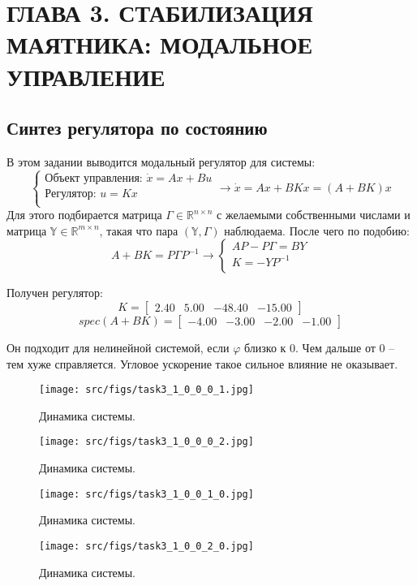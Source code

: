 \section{ГЛАВА 3. СТАБИЛИЗАЦИЯ МАЯТНИКА: МОДАЛЬНОЕ УПРАВЛЕНИЕ}

\subsection{Синтез регулятора по состоянию}
В этом задании выводится модальный регулятор для системы:
\[
        \begin{cases}
                \text{Объект управления: }\dot{x} = A x + Bu \\
                \text{Регулятор: }u = K x \\
        \end{cases} \rightarrow
        \dot{x} = A x + BKx = (A+BK)x
\]
Для этого подбирается матрица \(\Gamma \in \mathds{R}^{n \times n}\) с желаемыми собственными числами и матрица \(\mathds{Y} \in \mathds{R}^{m \times n}\), такая что пара \((\mathds{Y}, \Gamma)\) наблюдаема. После чего по подобию:
\[A+BK = P \Gamma P^{-1} \rightarrow
        \begin{cases}
                AP - P\Gamma = BY \\
                K = -YP^{-1} \\
        \end{cases}
\]

Получен регулятор:
\[K = \begin{bmatrix}
        2.40 &  5.00 & -48.40 & -15.00
      \end{bmatrix}\]
\[spec(A + B K) = \begin{bmatrix}
-4.00 & -3.00 & -2.00 & -1.00
\end{bmatrix}\]

Он подходит для нелинейной системой, если \(\varphi\) близко к 0. Чем дальше от 0 -- тем хуже справляется. Угловое ускорение такое сильное влияние не оказывает.
\begin{figure}[ht!]
  \centering
  \texttt{[image: src/figs/task3\_1\_0\_0\_0\_1.jpg]}
  \caption{Динамика системы.}
  \label{fig:task3_1_0_0_0_1.jpg}
\end{figure}
\begin{figure}[ht!]
        \centering
        \texttt{[image: src/figs/task3\_1\_0\_0\_0\_2.jpg]}
        \caption{Динамика системы.}
        \label{fig:task3_1_0_0_0_2.jpg}
\end{figure}
\begin{figure}[ht!]
        \centering
        \texttt{[image: src/figs/task3\_1\_0\_0\_1\_0.jpg]}
        \caption{Динамика системы.}
        \label{fig:task3_1_0_0_1_0.jpg}
\end{figure}
\begin{figure}[ht!]
        \centering
        \texttt{[image: src/figs/task3\_1\_0\_0\_2\_0.jpg]}
        \caption{Динамика системы.}
        \label{fig:task3_1_0_0_2_0.jpg}
\end{figure}
\FloatBarrier
